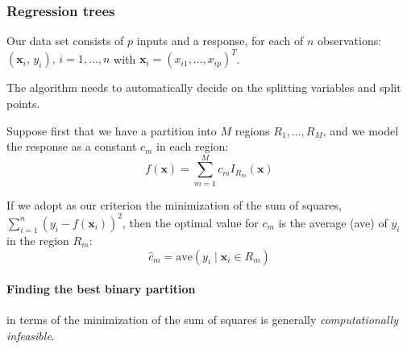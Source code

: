 \subsubsection{Regression trees}

Our data set consists of $p$ inputs and a response, for each of $n$ observations:
$(\boldsymbol{x}_i,\,y_i),\, i=1,\dots,n$ with $\boldsymbol{x}_i=(x_{i1},\dots,x_{ip})^T$.

The algorithm needs to automatically decide on the splitting variables and split points.

Suppose first that we have a partition into $M$ regions $R_1,\dots,R_M$,
and we model the response as a constant $c_m$ in each region:
\begin{equation*}
	{f}(\boldsymbol x) = \sum_{m=1}^M c_m I_{R_m}(\boldsymbol x)
\end{equation*}

If we adopt as our criterion the minimization of the sum of squares,
$\sum_{i=1}^n (y_i - {f}(\boldsymbol x_i))^2$, then the optimal
value for $c_m$ is the average (ave) of $y_i$ in the region $R_m$:
\begin{equation*}
	\hat{c}_m = \text{ave}(y_i \mid \boldsymbol x_i \in R_m)
\end{equation*}

\paragraph{Finding the best binary partition} in terms of the minimization of the
sum of squares is generally \emph{computationally infeasible}.

